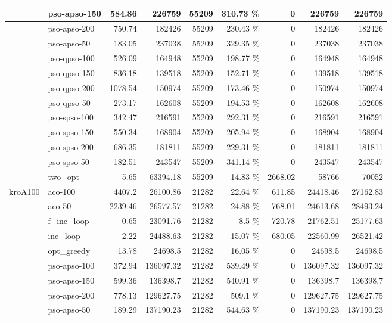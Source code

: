 \documentclass[conference]{IEEEtran}
\begin{document}
\begin{center}
\begin{longtable}[ht]{|l|l|r|r|r|r|r|r|r|}
 & pso-apso-150 & 584.86 & 226759 & 55209 & 310.73 \% & 0 & 226759 & 226759 \\ \hline
 & pso-apso-200 & 750.74 & 182426 & 55209 & 230.43 \% & 0 & 182426 & 182426 \\ \hline
 & pso-apso-50 & 183.05 & 237038 & 55209 & 329.35 \% & 0 & 237038 & 237038 \\ \hline
 & pso-qpso-100 & 526.09 & 164948 & 55209 & 198.77 \% & 0 & 164948 & 164948 \\ \hline
 & pso-qpso-150 & 836.18 & 139518 & 55209 & 152.71 \% & 0 & 139518 & 139518 \\ \hline
 & pso-qpso-200 & 1078.54 & 150974 & 55209 & 173.46 \% & 0 & 150974 & 150974 \\ \hline
 & pso-qpso-50 & 273.17 & 162608 & 55209 & 194.53 \% & 0 & 162608 & 162608 \\ \hline
 & pso-spso-100 & 342.47 & 216591 & 55209 & 292.31 \% & 0 & 216591 & 216591 \\ \hline
 & pso-spso-150 & 550.34 & 168904 & 55209 & 205.94 \% & 0 & 168904 & 168904 \\ \hline
 & pso-spso-200 & 686.35 & 181811 & 55209 & 229.31 \% & 0 & 181811 & 181811 \\ \hline
 & pso-spso-50 & 182.51 & 243547 & 55209 & 341.14 \% & 0 & 243547 & 243547 \\ \hline
 & two\_opt & 5.65 & 63394.18 & 55209 & 14.83 \% & 2668.02 & 58766 & 70052 \\ \hline
kroA100 & aco-100 & 4407.2 & 26100.86 & 21282 & 22.64 \% & 611.85 & 24418.46 & 27162.83 \\ \hline
 & aco-50 & 2239.46 & 26577.57 & 21282 & 24.88 \% & 768.01 & 24613.68 & 28493.24 \\ \hline
 & f\_inc\_loop & 0.65 & 23091.76 & 21282 & 8.5 \% & 720.78 & 21762.51 & 25177.63 \\ \hline
 & inc\_loop & 2.22 & 24488.63 & 21282 & 15.07 \% & 680.05 & 22560.99 & 26521.42 \\ \hline
 & opt\_greedy & 13.78 & 24698.5 & 21282 & 16.05 \% & 0 & 24698.5 & 24698.5 \\ \hline
 & pso-apso-100 & 372.94 & 136097.32 & 21282 & 539.49 \% & 0 & 136097.32 & 136097.32 \\ \hline
 & pso-apso-150 & 599.36 & 136398.7 & 21282 & 540.91 \% & 0 & 136398.7 & 136398.7 \\ \hline
 & pso-apso-200 & 778.13 & 129627.75 & 21282 & 509.1 \% & 0 & 129627.75 & 129627.75 \\ \hline
 & pso-apso-50 & 189.29 & 137190.23 & 21282 & 544.63 \% & 0 & 137190.23 & 137190.23 \\ \hline

\end{longtable}
\end{center}
\end{document}
